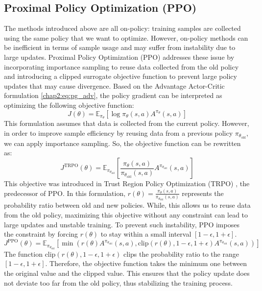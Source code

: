 \subsection{Proximal Policy Optimization (PPO)}

The methods introduced above are all on-policy: training samples are collected using the same policy that we want to optimize.
However, on-policy methods can be inefficient in terms of sample usage and may suffer from instability due to large updates.
Proximal Policy Optimization (PPO) \cite{PPO} addresses these issue by incorporating importance sampling to reuse data collected from the old policy and introducing a clipped surrogate objective function to prevent large policy updates that may cause divergence.
Based on the Advantage Actor-Critic formulation \cref{chap2:eq:pg_adv}, the policy gradient can be interpreted as optimizing the following objective function:
\begin{equation}
  J(\theta) = \mathbb{E}_{\pi_\theta}[\log \pi_\theta(s, a) A^{\pi_\theta}(s, a)]
\end{equation}
This formulation assumes that data is collected from the current policy.  
However, in order to improve sample efficiency by reusing data from a previous policy $\pi_{\theta_\text{old}}$, we can apply importance sampling.
So, the objective function can be rewritten as:
\begin{equation}
  J^{\text{TRPO}}(\theta) = \mathbb{E}_{\pi_{\theta_\text{old}}} \left[ \frac{\pi_\theta (s, a)}{\pi_{\theta_\text{old}}(s, a)}A^{\pi_{\theta_\text{old}}}(s, a) \right]
\end{equation}
This objective was introduced in Trust Region Policy Optimization (TRPO) \cite{TRPO}, the predecessor of PPO.
In this formulation, $r(\theta) = \frac{\pi_\theta (s, a)}{\pi_{\theta_\text{old}}(s, a)}$ represents the probability ratio between old and new policies.
While, this allows us to reuse data from the old policy, maximizing this objective without any constraint can lead to large updates and unstable training.
To prevent such instability, PPO imposes the constraint by forcing $r(\theta)$ to stay within a small interval $[1 - \epsilon, 1 + \epsilon]$.
\begin{equation}
  J^{\text{PPO}}(\theta) = \mathbb{E}_{\pi_{\theta_\text{old}}} \left[ \min \left( r(\theta) A^{\pi_{\theta_\text{old}}}(s, a), \text{clip}(r(\theta), 1 - \epsilon, 1 + \epsilon) A^{\pi_{\theta_\text{old}}}(s, a) \right) \right]
\end{equation}
The function $\text{clip}(r(\theta), 1 - \epsilon, 1 + \epsilon)$ clips the probability ratio to the range $[1 - \epsilon, 1 + \epsilon]$.
Therefore, the objective function takes the minimum one between the original value and the clipped value.
This ensures that the policy update does not deviate too far from the old policy, thus stabilizing the training process.


